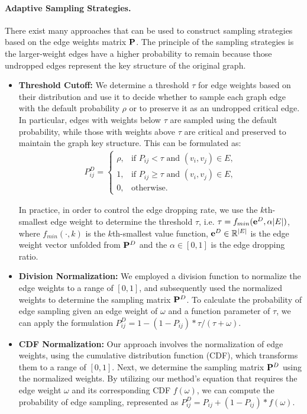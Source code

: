 \paragraph{Adaptive Sampling Strategies.}
There exist many approaches that can be used to construct sampling strategies \cite{gao2021training} based on the edge weights matrix $\mathbf{P}$. 
The principle of the sampling strategies is the larger-weight edges have a higher probability to remain because those undropped edges represent the key structure of the original graph.
\begin{itemize}
    \item \textbf{Threshold Cutoff:} We determine a threshold $\tau$ for edge weights based on their distribution and use it to decide whether to sample each graph edge with the default probability $\rho$ or to preserve it as an undropped critical edge. In particular, edges with weights below $\tau$ are sampled using the default probability, while those with weights above $\tau$  are critical and preserved to maintain the graph key structure. This can be formulated as:
    \begin{align}
    \label{eq:threshold_cutoff_dorpedge}
        P^{D}_{ij}=\left\{\begin{array}{cl}
	\rho, & \text{if } P_{ij}<\tau \text{ and } (v_i,v_j)\in E, \\
    1, & \text{if } P_{ij}\ge\tau \text{ and } (v_i,v_j)\in E, \\
	0, & \text{otherwise.} 
        \end{array}\right.
    \end{align}    
 
In practice, in order to control the edge dropping rate, we use the $k$th-smallest edge weight to determine the threshold $\tau$, i.e. $\tau = f_{min}(\mathbf{e}^{D}, \alpha |E|)$, where $f_{min}(\cdot,k)$ is the $k$th-smallest value function, $\mathbf{e}^{D} \in \mathbb{R}^{|E|}$ is the edge weight vector unfolded from $\mathbf{P}^D$ and the $\alpha \in [0,1]$ is the edge dropping ratio. 
\item \textbf{Division Normalization:}
We employed a division function to normalize the edge weights to a range of $[0, 1]$, and subsequently used the normalized weights to determine the sampling matrix $\mathbf{P}^D$. To calculate the probability of edge sampling given an edge weight of $\omega$ and a function parameter of $\tau$, we can apply the formulation $P^D_{ij} = 1 - (1 - P_{ij}) * \tau/(\tau + \omega)$.

\item \textbf{CDF Normalization:}
Our approach involves the normalization of edge weights, using the cumulative distribution function (CDF), which transforms them to a range of $[0, 1]$. Next, we determine the sampling matrix $\mathbf{P}^D$ using the normalized weights. By utilizing our method's equation that requires the edge weight $\omega$ and its corresponding CDF $f(\omega)$, we can compute the probability of edge sampling, represented as $P^D_{ij} = P_{ij} + (1 - P_{ij}) * f(\omega)$.
    
\end{itemize}


